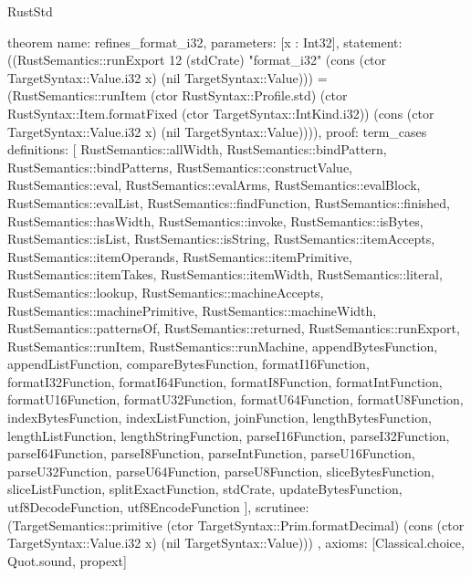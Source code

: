 \begin{lexlean}{RustStd}
\begin{semanticmodule}
theorem{
  name: refines_format_i32,
  parameters: [x : Int32],
  statement: ((RustSemantics::runExport 12 (stdCrate) "format_i32" (cons (ctor TargetSyntax::Value.i32 x) (nil TargetSyntax::Value))) = (RustSemantics::runItem (ctor RustSyntax::Profile.std) (ctor RustSyntax::Item.formatFixed (ctor TargetSyntax::IntKind.i32)) (cons (ctor TargetSyntax::Value.i32 x) (nil TargetSyntax::Value)))),
  proof: term_cases{
    definitions: [
      RustSemantics::allWidth,
      RustSemantics::bindPattern,
      RustSemantics::bindPatterns,
      RustSemantics::constructValue,
      RustSemantics::eval,
      RustSemantics::evalArms,
      RustSemantics::evalBlock,
      RustSemantics::evalList,
      RustSemantics::findFunction,
      RustSemantics::finished,
      RustSemantics::hasWidth,
      RustSemantics::invoke,
      RustSemantics::isBytes,
      RustSemantics::isList,
      RustSemantics::isString,
      RustSemantics::itemAccepts,
      RustSemantics::itemOperands,
      RustSemantics::itemPrimitive,
      RustSemantics::itemTakes,
      RustSemantics::itemWidth,
      RustSemantics::literal,
      RustSemantics::lookup,
      RustSemantics::machineAccepts,
      RustSemantics::machinePrimitive,
      RustSemantics::machineWidth,
      RustSemantics::patternsOf,
      RustSemantics::returned,
      RustSemantics::runExport,
      RustSemantics::runItem,
      RustSemantics::runMachine,
      appendBytesFunction,
      appendListFunction,
      compareBytesFunction,
      formatI16Function,
      formatI32Function,
      formatI64Function,
      formatI8Function,
      formatIntFunction,
      formatU16Function,
      formatU32Function,
      formatU64Function,
      formatU8Function,
      indexBytesFunction,
      indexListFunction,
      joinFunction,
      lengthBytesFunction,
      lengthListFunction,
      lengthStringFunction,
      parseI16Function,
      parseI32Function,
      parseI64Function,
      parseI8Function,
      parseIntFunction,
      parseU16Function,
      parseU32Function,
      parseU64Function,
      parseU8Function,
      sliceBytesFunction,
      sliceListFunction,
      splitExactFunction,
      stdCrate,
      updateBytesFunction,
      utf8DecodeFunction,
      utf8EncodeFunction
    ],
    scrutinee: (TargetSemantics::primitive (ctor TargetSyntax::Prim.formatDecimal) (cons (ctor TargetSyntax::Value.i32 x) (nil TargetSyntax::Value)))
  },
  axioms: [Classical.choice, Quot.sound, propext]
}


\end{semanticmodule}
\end{lexlean}
